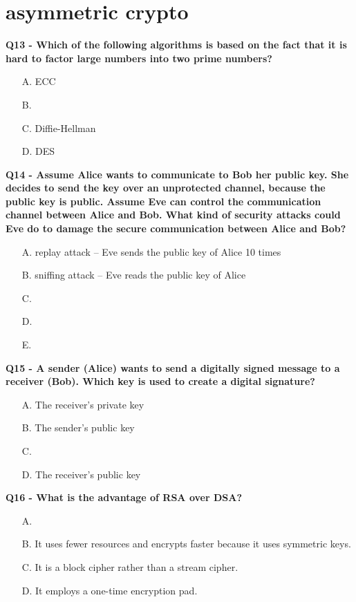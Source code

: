 \section{asymmetric crypto}

\textbf{Q13 - Which of the following algorithms is based on the fact that it is hard to factor large numbers into two prime numbers?}
\begin{enumerate}
    \item[A.] ECC
    \item[B.] 
    \item[C.] Diffie-Hellman
    \item[D.] DES
\end{enumerate}

\textbf{Q14 - Assume Alice wants to communicate to Bob her public key. She decides to send the key over an unprotected channel, because the public key is public. Assume Eve can control the communication channel between Alice and Bob. What kind of security attacks could Eve do to damage the secure communication between Alice and Bob?}
\begin{enumerate}
    \item[A.] replay attack – Eve sends the public key of Alice 10 times
    \item[B.] sniffing attack – Eve reads the public key of Alice
    \item[C.] 
    \item[D.] 
    \item[E.] 
\end{enumerate}

\textbf{Q15 - A sender (Alice) wants to send a digitally signed message to a receiver (Bob). Which key is used to create a digital signature?}
\begin{enumerate}
    \item[A.] The receiver’s private key
    \item[B.] The sender’s public key
    \item[C.] 
    \item[D.] The receiver’s public key
\end{enumerate}

\textbf{Q16 - What is the advantage of RSA over DSA?}
\begin{enumerate}
    \item[A.] 
    \item[B.] It uses fewer resources and encrypts faster because it uses symmetric keys.
    \item[C.] It is a block cipher rather than a stream cipher.
    \item[D.] It employs a one-time encryption pad.
\end{enumerate}

